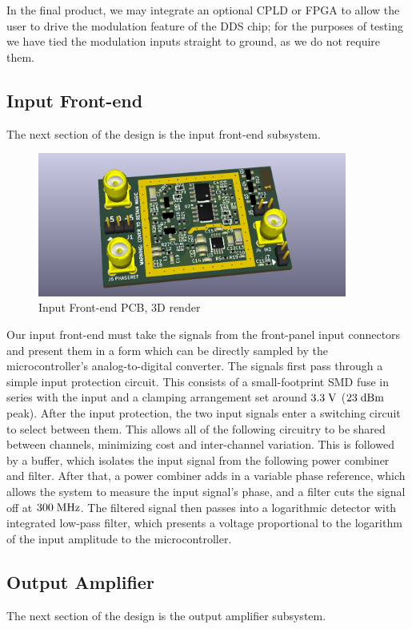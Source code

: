 In the final product, we may integrate an optional CPLD or FPGA to allow the user
to drive the modulation feature of the DDS chip; for the purposes of testing we
have tied the modulation inputs straight to ground, as we do not require them.

\subsection{Input Front-end}
The next section of the design is the input front-end subsystem.

\begin{figure}[H]
\centering
\includegraphics[width=4in]{frontend3d.png}
\caption{Input Front-end PCB, 3D render}
\label{fig:front3d}
\end{figure}

Our input front-end must take the signals from the front-panel input connectors
and present them in a form which can be directly sampled by the
microcontroller's analog-to-digital converter. The signals first pass through a
simple input protection circuit. This consists of a small-footprint SMD fuse in
series with the input and a clamping arrangement set around $3.3\;\mathrm{V}$
($23\;\mathrm{dBm}$ peak).  After the input protection, the two input signals enter
a switching circuit to select between them. This allows all of the following
circuitry to be shared between channels, minimizing cost and inter-channel
variation. This is followed by a buffer, which isolates the input signal from
the following power combiner and filter. After that, a power combiner adds in a
variable phase reference, which allows the system to measure the input signal's
phase, and a filter cuts the signal off at $300\;\mathrm{MHz}$. The filtered signal
then passes into a logarithmic detector with integrated low-pass filter, which
presents a voltage proportional to the logarithm of the input amplitude to the
microcontroller.

\subsection{Output Amplifier}
The next section of the design is the output amplifier subsystem.

